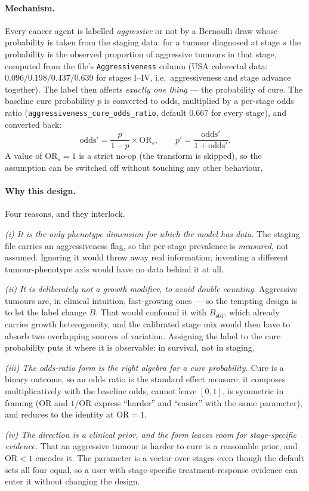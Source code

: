 \documentclass[12pt,a4paper]{article}
\newcommand{\id}[1]{\texttt{#1}}
\newcommand{\mech}[1]{\paragraph{Mechanism.} #1}
\newcommand{\why}[1]{\paragraph{Why this design.} #1}
\begin{document}
\mech{Every cancer agent is labelled \emph{aggressive} or not by a Bernoulli draw whose probability is
taken from the staging data: for a tumour diagnosed at stage $s$ the probability is the observed
proportion of aggressive tumours in that stage, computed from the file's \id{Aggressiveness} column
(USA colorectal data: $0.096 / 0.198 / 0.437 / 0.639$ for stages I--IV, i.e.\ aggressiveness and stage
advance together). The label then affects \emph{exactly one thing} --- the probability of cure. The
baseline cure probability $p$ is converted to odds, multiplied by a per-stage odds ratio
(\id{aggressiveness\_cure\_odds\_ratio}, default $0.667$ for every stage), and converted back:
\[
\text{odds}' = \frac{p}{1-p}\times \mathrm{OR}_s, \qquad
p' = \frac{\text{odds}'}{1 + \text{odds}'}.
\]
A value of $\mathrm{OR}_s = 1$ is a strict no-op (the transform is skipped), so the assumption can be
switched off without touching any other behaviour.}

\why{Four reasons, and they interlock.

\emph{(i) It is the only phenotype dimension for which the model has data.} The staging file carries an
aggressiveness flag, so the per-stage prevalence is \emph{measured}, not assumed. Ignoring it would throw
away real information; inventing a different tumour-phenotype axis would have no data behind it at all.

\emph{(ii) It is deliberately not a growth modifier, to avoid double counting.} Aggressive tumours are, in
clinical intuition, fast-growing ones --- so the tempting design is to let the label change $B$. That would
confound it with $B_{\text{std}}$, which already carries growth heterogeneity, and the calibrated stage mix
would then have to absorb two overlapping sources of variation. Assigning the label to the cure
probability puts it where it is observable: in survival, not in staging.

\emph{(iii) The odds-ratio form is the right algebra for a cure probability.} Cure is a binary outcome, so
an odds ratio is the standard effect measure; it composes multiplicatively with the baseline odds, cannot
leave $[0,1]$, is symmetric in framing ($\mathrm{OR}$ and $1/\mathrm{OR}$ express ``harder'' and
``easier'' with the same parameter), and reduces to the identity at $\mathrm{OR} = 1$.

\emph{(iv) The direction is a clinical prior, and the form leaves room for stage-specific evidence.} That
an aggressive tumour is harder to cure is a reasonable prior, and $\mathrm{OR}<1$ encodes it. The parameter
is a vector over stages even though the default sets all four equal, so a user with stage-specific
treatment-response evidence can enter it without changing the design.}
\end{document}

